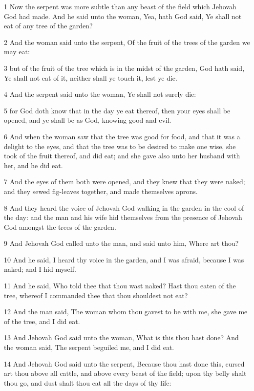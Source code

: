\par 1 Now the serpent was more subtle than any beast of the field which Jehovah God had made. And he said unto the woman, Yea, hath God said, Ye shall not eat of any tree of the garden?
\par 2 And the woman said unto the serpent, Of the fruit of the trees of the garden we may eat:
\par 3 but of the fruit of the tree which is in the midst of the garden, God hath said, Ye shall not eat of it, neither shall ye touch it, lest ye die.
\par 4 And the serpent said unto the woman, Ye shall not surely die:
\par 5 for God doth know that in the day ye eat thereof, then your eyes shall be opened, and ye shall be as God, knowing good and evil.
\par 6 And when the woman saw that the tree was good for food, and that it was a delight to the eyes, and that the tree was to be desired to make one wise, she took of the fruit thereof, and did eat; and she gave also unto her husband with her, and he did eat.
\par 7 And the eyes of them both were opened, and they knew that they were naked; and they sewed fig-leaves together, and made themselves aprons.
\par 8 And they heard the voice of Jehovah God walking in the garden in the cool of the day: and the man and his wife hid themselves from the presence of Jehovah God amongst the trees of the garden.
\par 9 And Jehovah God called unto the man, and said unto him, Where art thou?
\par 10 And he said, I heard thy voice in the garden, and I was afraid, because I was naked; and I hid myself.
\par 11 And he said, Who told thee that thou wast naked? Hast thou eaten of the tree, whereof I commanded thee that thou shouldest not eat?
\par 12 And the man said, The woman whom thou gavest to be with me, she gave me of the tree, and I did eat.
\par 13 And Jehovah God said unto the woman, What is this thou hast done? And the woman said, The serpent beguiled me, and I did eat.
\par 14 And Jehovah God said unto the serpent, Because thou hast done this, cursed art thou above all cattle, and above every beast of the field; upon thy belly shalt thou go, and dust shalt thou eat all the days of thy life:
